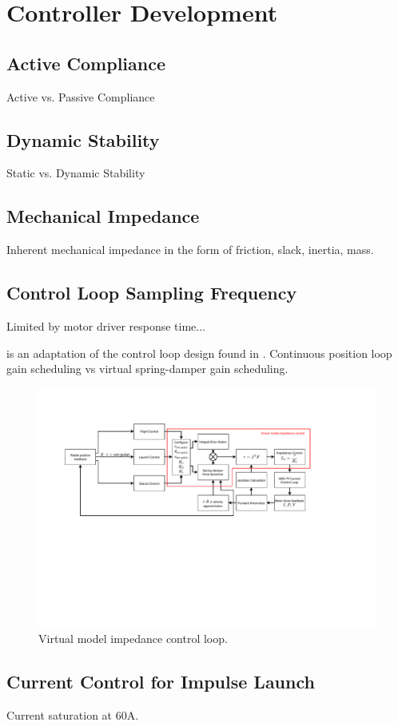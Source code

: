 \chapter{Controller Development}

\section{Active Compliance}
Active vs. Passive Compliance
\section{Dynamic Stability}
Static vs. Dynamic Stability

\section{Mechanical Impedance}
Inherent mechanical impedance in the form of friction, slack, inertia, mass.

\section{Control Loop Sampling Frequency}

Limited by motor driver response time...

 is an adaptation of the control loop design found in \cite{Kalouche2016}. Continuous position loop gain scheduling vs virtual spring-damper gain scheduling.

\begin{figure}
\centering
\includegraphics[clip, trim=2cm 7cm 5cm 3cm, page = 1, width=1\textwidth]{images/control/virtual-model-impedance.pdf} 
\caption{Virtual model impedance control loop.}
\label{fig:virtual-model-impedance-loop}
\end{figure}

\section{Current Control for Impulse Launch}

Current saturation at 60A.
